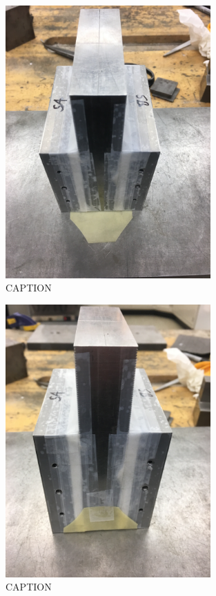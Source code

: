 \begin{figure}
	\centering
        \includegraphics[width=0.7\textwidth]{appendix_sample_prep/dds_trimmed_rubber.jpg}
   	\caption{CAPTION}
  	\label{Fig:dds_trimmed_rubber}
\end{figure}

\begin{figure}
	\centering
        \includegraphics[width=0.7\textwidth]{appendix_sample_prep/dds_taped_rubber.jpg}
   	\caption{CAPTION}
  	\label{Fig:dds_taped_rubber}
\end{figure}

